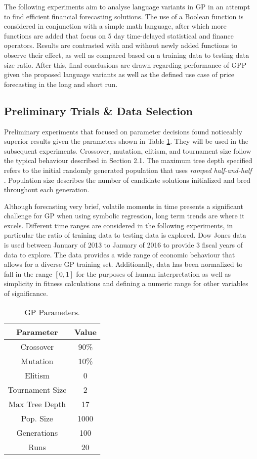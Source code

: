 \documentclass[12pt, letterpaper]{article}
\begin{document}
\textrm{ \indent The following experiments aim to analyse language variants in GP in an attempt to find efficient financial forecasting solutions. The use of a Boolean function is considered in conjunction with a simple math language, after which more functions are added that focus on 5 day time-delayed statistical and finance operators. Results are contrasted with and without newly added functions to observe their effect, as well as compared based on a training data to testing data size ratio. After this, final conclusions are drawn regarding performance of GPP given the proposed language variants as well as the defined use case of price forecasting in the long and short run. }

\subsection{Preliminary Trials \& Data Selection}

\textrm{ \indent Preliminary experiments that focused on parameter decisions found noticeably superior results given the parameters shown in Table \ref{fig:params}. They will be used in the subsequent experiments. Crossover, mutation, elitism, and tournament size follow the typical behaviour described in Section 2.1. The maximum tree depth specified refers to the initial randomly generated population that uses \textit{ramped half-and-half} \cite{fieldguide}. Population size describes the number of candidate solutions initialized and bred throughout each generation.}

\textrm{ \indent Although forecasting very brief, volatile moments in time presents a significant challenge for GP when using symbolic regression, long term trends are where it excels. Different time ranges are considered in the following experiments, in particular the ratio of training data to testing data is explored. Dow Jones data is used between January of 2013 to January of 2016 to provide 3 fiscal years of data to explore. The data provides a wide range of economic behaviour that allows for a diverse GP training set. Additionally, data has been normalized to fall in the range $[0, 1]$ for the purposes of human interpretation as well as simplicity in fitness calculations and defining a numeric range for other variables of significance.}

\begin{table}[!ht]
\centering
 \begin{tabular}{||c|c||}
 \hline
 \textbf{Parameter} & \textbf{Value}  \\ [0.5ex] 
 \hline\hline
 Crossover & 90\% \\ \hline
 Mutation & 10\% \\ \hline
 Elitism & 0 \\ \hline
 Tournament Size & 2 \\ \hline
 Max Tree Depth & 17 \\ \hline
 Pop. Size & 1000 \\ \hline
 Generations & 100 \\ \hline
 Runs & 20 \\ \hline
 \hline
\end{tabular}
\caption{GP Parameters.}
\label{fig:params}
\end{table}
\end{document}
